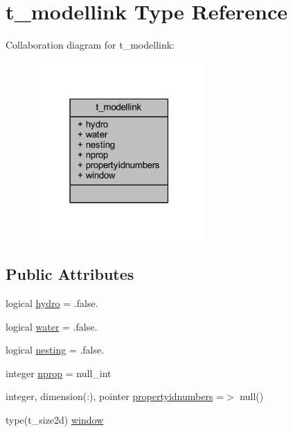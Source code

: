 \hypertarget{structt__modellink}{}\section{t\+\_\+modellink Type Reference}
\label{structt__modellink}


Collaboration diagram for t\+\_\+modellink\+:\nopagebreak
\begin{figure}[H]
\begin{center}
\leavevmode
\includegraphics[width=186pt]{structt__modellink__coll__graph}
\end{center}
\end{figure}
\subsection*{Public Attributes}
\begin{DoxyCompactItemize}
\item 
logical \mbox{\hyperlink{structt__modellink_ae683e7f9ed2ad590a12b0b27f3569fda}{hydro}} = .false.
\item 
logical \mbox{\hyperlink{structt__modellink_a8cbf666d7c49e4addc2ed132ed173ee1}{water}} = .false.
\item 
logical \mbox{\hyperlink{structt__modellink_ade17596e2ed103b8ab7cd1cab6e609c9}{nesting}} = .false.
\item 
integer \mbox{\hyperlink{structt__modellink_a5beab2364e965c72d83efad45f8f43f0}{nprop}} = null\+\_\+int
\item 
integer, dimension(\+:), pointer \mbox{\hyperlink{structt__modellink_ac8296fbe96171a00786bb1031a2645d4}{propertyidnumbers}} =$>$ null()
\item 
type(t\+\_\+size2d) \mbox{\hyperlink{structt__modellink_ae56cb30e76665a2ca2d964852f534e79}{window}}
\end{DoxyCompactItemize}


